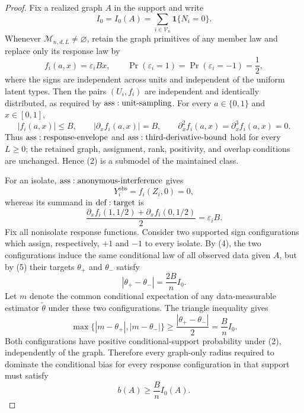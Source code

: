 \documentclass{article}
\begin{document}
\begin{proof}
Fix a realized graph \(A\) in the support and write
\[
 I_0=I_0(A)=\sum_{i\in\mathcal V_n}\mathbf1\{N_i=0\}.
\tag{1}
\]
Whenever \(\mathcal M_{n,d,L}\ne\varnothing\), retain the graph primitives of any member law and replace only its response law by
\[
 f_i(a,x)=\varepsilon_iBx,
 \qquad
 \Pr(\varepsilon_i=1)=\Pr(\varepsilon_i=-1)=\frac12,
\tag{2}
\]
where the signs are independent across units and independent of the uniform latent types.  Then the pairs \((U_i,f_i)\) are independent and identically distributed, as required by \({\rm ass:unit\text{-}sampling}\).  For every \(a\in\{0,1\}\) and \(x\in[0,1]\),
\[
 |f_i(a,x)|\leq B,\qquad
 |\partial_x f_i(a,x)|=B,\qquad
 \partial_x^2f_i(a,x)=\partial_x^3f_i(a,x)=0.
\tag{3}
\]
Thus \({\rm ass:response\text{-}envelope}\) and \({\rm ass:third\text{-}derivative\text{-}bound}\) hold for every \(L\geq0\); the retained graph, assignment, rank, positivity, and overlap conditions are unchanged.  Hence (2) is a submodel of the maintained class.

For an isolate, \({\rm ass:anonymous\text{-}interference}\) gives
\[
 Y_i^{\mathrm{obs}}=f_i(Z_i,0)=0,
\tag{4}
\]
whereas its summand in \({\rm def:target}\) is
\[
 \frac{\partial_xf_i(1,1/2)+\partial_xf_i(0,1/2)}2
 =\varepsilon_iB.
\tag{5}
\]
Fix all nonisolate response functions.  Consider two supported sign configurations which assign, respectively, \(+1\) and \(-1\) to every isolate.  By (4), the two configurations induce the same conditional law of all observed data given \(A\), but by (5) their targets \(\theta_+\) and \(\theta_-\) satisfy
\[
 |\theta_+-\theta_-|=\frac{2B}{n}I_0.
\tag{6}
\]
Let \(m\) denote the common conditional expectation of any data-measurable estimator \(\widetilde\theta\) under these two configurations.  The triangle inequality gives
\[
 \max\{|m-\theta_+|,|m-\theta_-|\}
 \geq\frac{|\theta_+-\theta_-|}{2}
 =\frac BnI_0.
\tag{7}
\]
Both configurations have positive conditional-support probability under (2), independently of the graph.  Therefore every graph-only radius required to dominate the conditional bias for every response configuration in that support must satisfy
\[
 b(A)\geq\frac BnI_0(A).
\tag{8}
\]


\end{proof}
\end{document}
